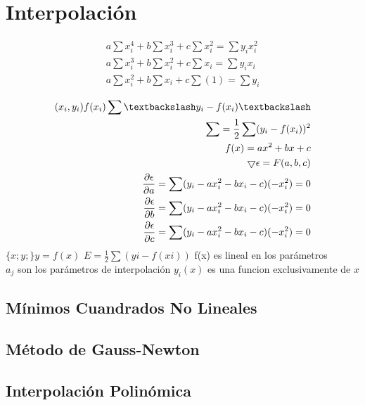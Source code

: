 \chapter{Interpolaci\'on}
\begin{eqnarray}
a\sum x_i^4 + b\sum x_i^3 + c\sum x_i^2 = \sum y_ix_i^2 \\
a\sum x_i^3 + b\sum x_i^2 + c\sum x_i = \sum y_ix_i\\ 
a\sum x_i^2 + b\sum x_i + c\sum(1) = \sum y_i
\end{eqnarray}

\begin{eqnarray}
(x_i , y_i) f(x_i) \sum \textbackslash y_i-f(x_i) \textbackslash \\
\sum = \frac{1}{2}\sum(y_i-f(x_i))^2\\
f(x) = ax^2+bx+c \\
\bigtriangledown \epsilon = F(a, b, c) \\
\frac{ \partial \epsilon}{\partial a} = \sum(y_i - ax_i^2 - bx_i - c)(-x_i^2) = 0\\
\frac{\partial \epsilon}{\partial b} = \sum(y_i - ax_i^2 - bx_i - c)(-x_i^2) = 0 \\
\frac{\partial \epsilon}{\partial c} = \sum(y_i - ax_i^2 - bx_i - c)(-x_i^2) = 0
\end{eqnarray} 
$\{x;y;\} y = f(x)$
$E=\frac{1}{2}\sum(yi-f(xi))$%
f(x) es lineal en los par\'ametros\\
$a_j$ son los par\'ametros de interpolaci\'on
$y_i(x)$ es una funcion exclusivamente de $x$



\section{M\'inimos Cuandrados No Lineales}

\section{M\'etodo de Gauss-Newton}

\section{Interpolaci\'on Polin\'omica}
